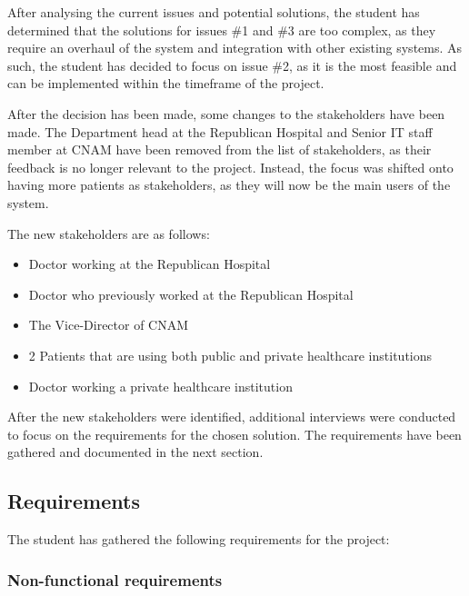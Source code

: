 After analysing the current issues and potential solutions, the student has determined that the solutions for issues \#1 and \#3 are too complex, as they require an overhaul of the system and integration with other existing systems. As such, the student has decided to focus on issue \#2, as it is the most feasible and can be implemented within the timeframe of the project. 

After the decision has been made, some changes to the stakeholders have been made. The Department head at the Republican Hospital and Senior IT staff member at CNAM have been removed from the list of stakeholders, as their feedback is no longer relevant to the project. Instead, the focus was shifted onto having more patients as stakeholders, as they will now be the main users of the system. 

The new stakeholders are as follows:
\begin{itemize}
    \item Doctor working at the Republican Hospital
    \item Doctor who previously worked at the Republican Hospital
    \item The Vice-Director of CNAM
    \item 2 Patients that are using both public and private healthcare institutions
    \item Doctor working a private healthcare institution
\end{itemize}

After the new stakeholders were identified, additional interviews were conducted to focus on the requirements for the chosen solution. The requirements have been gathered and documented in the next section.

\subsection{Requirements}

The student has gathered the following requirements for the project:

\subsubsection{Non-functional requirements}

